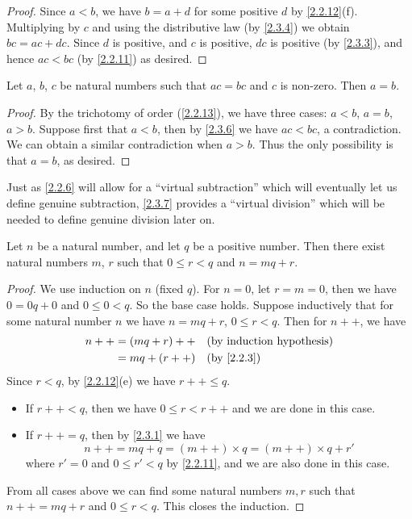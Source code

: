 \begin{proof}
  Since \(a < b\), we have \(b = a + d\) for some positive \(d\) by \cref{2.2.12}(f).
  Multiplying by \(c\) and using the distributive law (by \cref{2.3.4}) we obtain \(bc = ac + dc\).
  Since \(d\) is positive, and \(c\) is positive, \(dc\) is positive (by \cref{2.3.3}), and hence \(ac < bc\) (by \cref{2.2.11}) as desired.
\end{proof}

\begin{cor}\label{2.3.7}
  Let \(a\), \(b\), \(c\) be natural numbers such that \(ac = bc\) and \(c\) is non-zero.
  Then \(a = b\).
\end{cor}

\begin{proof}
  By the trichotomy of order (\cref{2.2.13}), we have three cases: \(a < b\), \(a = b\), \(a > b\).
  Suppose first that \(a < b\), then by \cref{2.3.6} we have \(ac < bc\), a contradiction.
  We can obtain a similar contradiction when \(a > b\).
  Thus the only possibility is that \(a = b\), as desired.
\end{proof}

\begin{rmk}\label{2.3.8}
  Just as \cref{2.2.6} will allow for a ``virtual subtraction'' which will eventually let us define genuine subtraction, \cref{2.3.7} provides a ``virtual division'' which will be needed to define genuine division later on.
\end{rmk}

\begin{prop}\label{2.3.9}
  Let \(n\) be a natural number, and let \(q\) be a positive number.
  Then there exist natural numbers \(m\), \(r\) such that \(0 \leq r < q\) and \(n = mq + r\).
\end{prop}

\begin{proof}
  We use induction on \(n\) (fixed \(q\)).
  For \(n = 0\), let \(r = m = 0\), then we have \(0 = 0q + 0\) and \(0 \leq 0 < q\).
  So the base case holds.
  Suppose inductively that for some natural number \(n\) we have \(n = mq + r\), \(0 \leq r < q\).
  Then for \(n++\), we have
  \begin{align*}
    n++ & = (mq + r)++ &  & \byIH      \\
        & = mq + (r++) &  & \by{2.2.3} \\
  \end{align*}
  Since \(r < q\), by \cref{2.2.12}(e) we have \(r++ \leq q\).
  \begin{itemize}
    \item If \(r++ < q\), then we have \(0 \leq r < r++\) and we are done in this case.
    \item If \(r++ = q\), then by \cref{2.3.1} we have
          \[
            n++ = mq + q = (m++) \times q = (m++) \times q + r'
          \]
          where \(r' = 0\) and \(0 \leq r' < q\) by \cref{2.2.11}, and we are also done in this case.
  \end{itemize}
  From all cases above we can find some natural numbers \(m, r\) such that \(n++ = mq + r\) and \(0 \leq r < q\).
  This closes the induction.
\end{proof}

